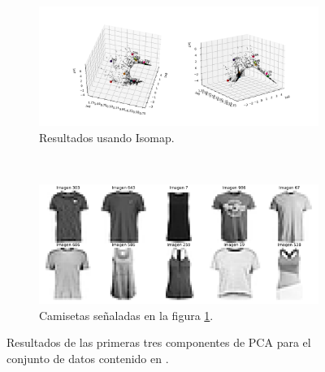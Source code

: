 \begin{figure}[H]
    \centering
    \begin{subfigure}{16cm}
        \includegraphics[width=16cm]{Graphics/Problema_3_1/isomap.png}
        \caption{Resultados usando Isomap.}
        \label{fig:problema5_isomap}
    \end{subfigure}\\
    \begin{subfigure}{16cm}
        \includegraphics[width=16cm]{Graphics/Problema_3_1/T_shirts_isomap.png}
        \caption{Camisetas señaladas en la figura \ref{fig:problema5_isomap}.}
        \label{fig:problema5_isomap_camisetas}
    \end{subfigure}
    \caption{Resultados de las primeras tres componentes de PCA para el conjunto de datos contenido en .}
    \label{fig:05_isomap}
\end{figure}